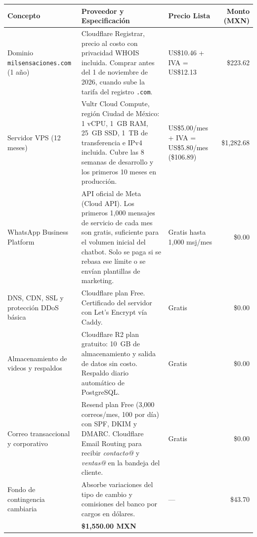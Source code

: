 \documentclass[11pt,letterpaper]{article}
\begin{document}
\begin{table}[H]
\centering
\small
\begin{tabularx}{\textwidth}{>{\raggedright\arraybackslash}p{3.4cm}>{\raggedright\arraybackslash}X>{\raggedright\arraybackslash}p{2.6cm}r}
\toprule
\rowcolor{MezcalAgave!15}
\textbf{Concepto} & \textbf{Proveedor y Especificación} & \textbf{Precio Lista} & \textbf{Monto (MXN)} \\
\midrule
Dominio \texttt{milsensaciones.com} (1 año) & Cloudflare Registrar, precio al costo con privacidad WHOIS incluida. Comprar antes del 1 de noviembre de 2026, cuando sube la tarifa del registro \texttt{.com}. & US\$10.46 + IVA = US\$12.13 & \$223.62 \\
\midrule
Servidor VPS (12 meses) & Vultr Cloud Compute, región Ciudad de México: 1 vCPU, 1~GB RAM, 25~GB SSD, 1~TB de transferencia e IPv4 incluida. Cubre las 8 semanas de desarrollo y los primeros 10 meses en producción. & US\$5.00/mes + IVA = US\$5.80/mes (\$106.89) & \$1,282.68 \\
\midrule
WhatsApp Business Platform & API oficial de Meta (Cloud API). Los primeros 1,000 mensajes de servicio de cada mes son gratis, suficiente para el volumen inicial del chatbot. Solo se paga si se rebasa ese límite o se envían plantillas de marketing. & Gratis hasta 1,000 msj/mes & \$0.00 \\
\midrule
DNS, CDN, SSL y protección DDoS básica & Cloudflare plan Free. Certificado del servidor con Let's Encrypt vía Caddy. & Gratis & \$0.00 \\
\midrule
Almacenamiento de videos y respaldos & Cloudflare R2 plan gratuito: 10~GB de almacenamiento y salida de datos sin costo. Respaldo diario automático de PostgreSQL. & Gratis & \$0.00 \\
\midrule
Correo transaccional y corporativo & Resend plan Free (3,000 correos/mes, 100 por día) con SPF, DKIM y DMARC. Cloudflare Email Routing para recibir \textit{contacto@} y \textit{ventas@} en la bandeja del cliente. & Gratis & \$0.00 \\
\midrule
Fondo de contingencia cambiaria & Absorbe variaciones del tipo de cambio y comisiones del banco por cargos en dólares. & --- & \$43.70 \\
\midrule
\rowcolor{MezcalGold!20}
\multicolumn{3}{l}{\textbf{TOTAL INFRAESTRUCTURA:}} & \textbf{\$1,550.00 MXN} \\
\bottomrule
\end{tabularx}
\end{table}
\end{document}
